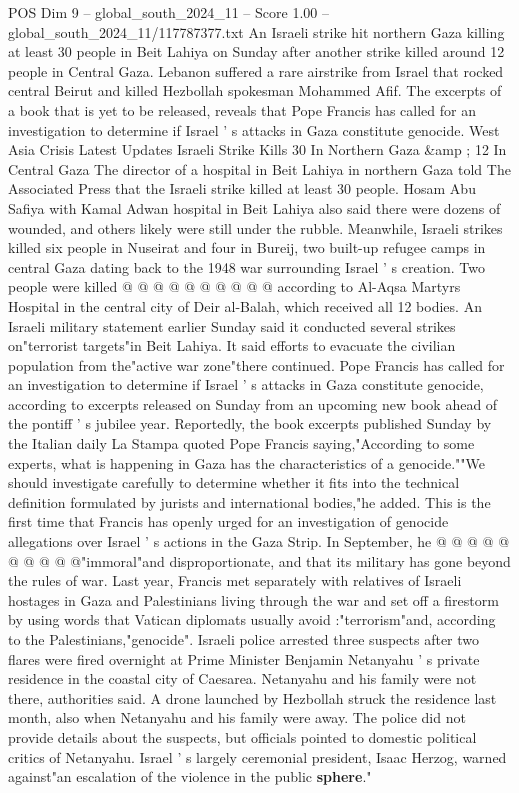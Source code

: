 \begin{textsample}{POS Dim 9 – global\_south\_2024\_11 – Score 1.00 – global\_south\_2024\_11/117787377.txt}  \label{ex:f9_pos_147}
An Israeli strike hit northern Gaza killing at least 30 people in Beit Lahiya on Sunday after another strike killed around 12 people in Central Gaza.
Lebanon suffered a rare airstrike from Israel that rocked central Beirut and killed Hezbollah spokesman Mohammed Afif.
The excerpts of a book that is yet to be released, reveals that Pope Francis has called for an investigation to determine if Israel ' s attacks in Gaza constitute genocide.
West Asia Crisis Latest Updates Israeli Strike Kills 30 In Northern Gaza \&amp ; 12 In Central Gaza The director of a hospital in Beit Lahiya in northern Gaza told The Associated Press that the Israeli strike killed at least 30 people.
Hosam Abu Safiya with Kamal Adwan hospital in Beit Lahiya also said there were dozens of wounded, and others likely were still under the rubble.
Meanwhile, Israeli strikes killed six people in Nuseirat and four in Bureij, two built-up refugee camps in central Gaza dating back to the 1948 war surrounding Israel ' s creation.
Two people were killed @ @ @ @ @ @ @ @ @ @ according to Al-Aqsa Martyrs Hospital in the central city of Deir al-Balah, which received all 12 bodies.
An Israeli military statement earlier Sunday said it conducted several strikes on"terrorist targets"in Beit Lahiya.
It said efforts to evacuate the civilian population from the"active war zone"there continued.
Pope Francis has called for an investigation to determine if Israel ' s attacks in Gaza constitute genocide, according to excerpts released on Sunday from an upcoming new book ahead of the pontiff ' s jubilee year.
Reportedly, the book excerpts published Sunday by the Italian daily La Stampa quoted Pope Francis saying,"According to some experts, what is happening in Gaza has the characteristics of a genocide.""We should investigate carefully to determine whether it fits into the technical definition formulated by jurists and international bodies,"he added.
This is the first time that Francis has openly urged for an investigation of genocide allegations over Israel ' s actions in the Gaza Strip.
In September, he @ @ @ @ @ @ @ @ @ @"immoral"and disproportionate, and that its military has gone beyond the rules of war.
Last year, Francis met separately with relatives of Israeli hostages in Gaza and Palestinians living through the war and set off a firestorm by using words that Vatican diplomats usually avoid :"terrorism"and, according to the Palestinians,"genocide".
Israeli police arrested three suspects after two flares were fired overnight at Prime Minister Benjamin Netanyahu ' s private residence in the coastal city of Caesarea.
Netanyahu and his family were not there, authorities said.
A drone launched by Hezbollah struck the residence last month, also when Netanyahu and his family were away.
The police did not provide details about the suspects, but officials pointed to domestic political critics of Netanyahu.
Israel ' s largely ceremonial president, Isaac Herzog, warned against"an escalation of the violence in the public \textbf{sphere}."

\end{textsample}
